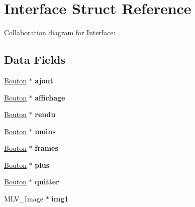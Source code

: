 \hypertarget{struct_interface}{\section{Interface Struct Reference}
\label{struct_interface}
}


Collaboration diagram for Interface\+:
\subsection*{Data Fields}
\begin{DoxyCompactItemize}
\item 
\hypertarget{struct_interface_a9215550ead5ce8e5b4dbf1dc41fe09f8}{\hyperlink{struct_bouton}{Bouton} $\ast$ {\bfseries ajout}}\label{struct_interface_a9215550ead5ce8e5b4dbf1dc41fe09f8}

\item 
\hypertarget{struct_interface_a525a013ca8e8c0f67744b675defef721}{\hyperlink{struct_bouton}{Bouton} $\ast$ {\bfseries affichage}}\label{struct_interface_a525a013ca8e8c0f67744b675defef721}

\item 
\hypertarget{struct_interface_a7b2c9bfdef049cf67d2eb9a9350f15cb}{\hyperlink{struct_bouton}{Bouton} $\ast$ {\bfseries rendu}}\label{struct_interface_a7b2c9bfdef049cf67d2eb9a9350f15cb}

\item 
\hypertarget{struct_interface_afc2e24f2e3631c11d211ca94ff57440d}{\hyperlink{struct_bouton}{Bouton} $\ast$ {\bfseries moins}}\label{struct_interface_afc2e24f2e3631c11d211ca94ff57440d}

\item 
\hypertarget{struct_interface_a601ce897ff1b84b0496c7da3fe677d56}{\hyperlink{struct_bouton}{Bouton} $\ast$ {\bfseries frames}}\label{struct_interface_a601ce897ff1b84b0496c7da3fe677d56}

\item 
\hypertarget{struct_interface_aa65f676aa0d68b29100b16256bbdfae3}{\hyperlink{struct_bouton}{Bouton} $\ast$ {\bfseries plus}}\label{struct_interface_aa65f676aa0d68b29100b16256bbdfae3}

\item 
\hypertarget{struct_interface_ae6d50ff5698e87b8e63b31cf4a2c9824}{\hyperlink{struct_bouton}{Bouton} $\ast$ {\bfseries quitter}}\label{struct_interface_ae6d50ff5698e87b8e63b31cf4a2c9824}

\item 
\hypertarget{struct_interface_a43c4d7e411c16e1b46639eda44552db4}{M\+L\+V\+\_\+\+Image $\ast$ {\bfseries img1}}\label{struct_interface_a43c4d7e411c16e1b46639eda44552db4}


\end{DoxyCompactItemize}
